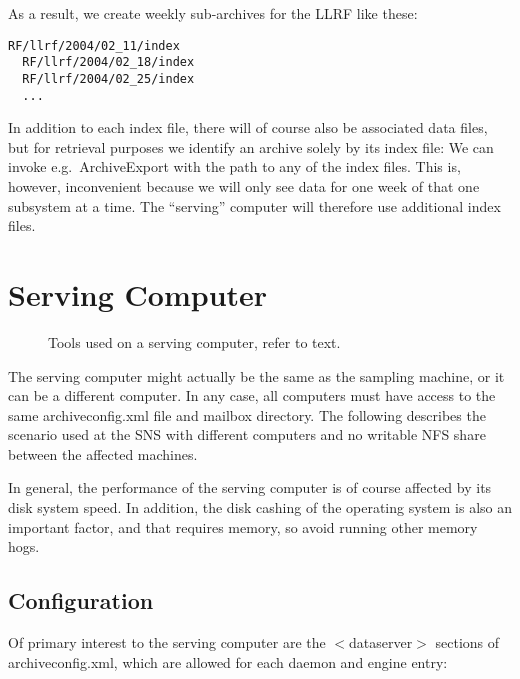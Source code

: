 \noindent As a result, we create weekly sub-archives for the LLRF like these:
\begin{lstlisting}[frame=none,keywordstyle=\sffamily]
  RF/llrf/2004/02_11/index
  RF/llrf/2004/02_18/index
  RF/llrf/2004/02_25/index
  ...
\end{lstlisting}
\noindent In addition to each index file, there will of course also be
associated data files, but for retrieval purposes we identify an
archive solely by its index file: We can invoke e.g.\ ArchiveExport
with the path to any of the index files. This is, however,
inconvenient because we will only see data for one week of that one
subsystem at a time.
The ``serving'' computer will therefore use additional index files.

\section{Serving Computer}  \label{sec:exampleServe}
\begin{figure}[htb]
\begin{center}
\end{center}
\caption{\label{fig:acServe}Tools used on a serving computer, refer to text.}
\end{figure}

\noindent The serving computer might actually be the same as the
sampling machine, or it can be a different computer. In any case, all
computers must have access to the same archiveconfig.xml file and
mailbox directory.
The following describes the scenario used at the SNS with 
different computers and no writable NFS share between the
affected machines.

In general, the performance of the serving computer is of course
affected by its disk system speed. In addition, the disk cashing of
the operating system is also an important factor, and that requires
memory, so avoid running other memory hogs.

\subsection{Configuration}
Of primary interest to the serving computer are the $<$dataserver$>$
sections of archiveconfig.xml, which are allowed for each daemon and
engine entry:

